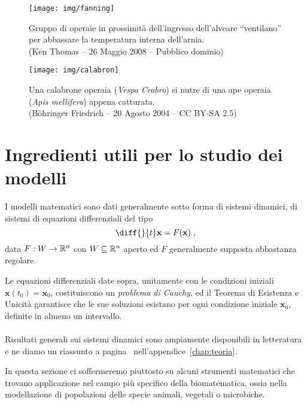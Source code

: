 \begin{figure}
    \centering
    \texttt{[image: img/fanning]}

    \caption[Ventilazione forzata per raffrescare l'interno dell'arnia.]{Gruppo di operaie in prossimità dell'ingresso dell'alveare ``ventilano'' per abbassare la temperatura interna dell'arnia.
        \\ (Ken Thomas -- 26 Maggio 2008 -- Pubblico dominio)}
    \label{img:fanning}
\end{figure}

\begin{figure}
    \centering
    \texttt{[image: img/calabron]}

    \caption[Ape predata da un calabrone.]{Una calabrone operaia (\emph{Vespa Crabro}) si nutre di una ape operaia (\emph{Apis mellifera}) appena catturata. \\ (Böhringer Friedrich -- 20 Agosto 2004 -- CC BY-SA 2.5)}
    \label{img:calabron}
\end{figure}


\section{Ingredienti utili per lo studio dei modelli}
\label{sec:ingredientiBioMat}
I modelli matematici sono dati generalmente sotto forma di sistemi dinamici, \ie di sistemi di equazioni
differenziali del tipo
$$\diff{}{t} \mathbf{x} = F( \mathbf{x} ) \; ,$$
data $F: W \to \mathbb{R}^n$ con $W \subseteq \mathbb{R}^n$ aperto ed $F$ generalmente supposta abbastanza regolare.

Le equazioni differenziali date sopra, unitamente con le condizioni iniziali $\mathbf{x} (t_0) = \mathbf{x}_0$,
costituiscono un \emph{problema di Cauchy}, ed il Teorema di Esistenza e Unicità garantisce che le sue soluzioni
esistano per ogni condizione iniziale $\mathbf{x}_0$, definite in almeno un intervallo.

\paragraph{}
Risultati generali sui sistemi dinamici sono ampiamente disponibili in letteratura e ne diamo un riassunto
a pagina~\pageref{chap:teoria} nell'appendice~\ref{chap:teoria}.

In questa sezione ci soffermeremo piuttosto su alcuni strumenti matematici che trovano applicazione nel campo
più specifico della biomatematica, ossia nella modellazione di popolazioni delle specie animali, vegetali
o microbiche.

